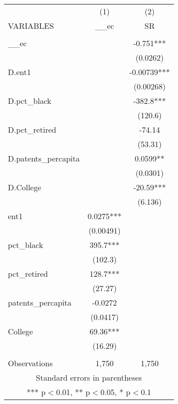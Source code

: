 \begin{tabular}{lcc} \hline
 & (1) & (2) \\
VARIABLES & \_\_ec & SR \\ \hline
 &  &  \\
\_\_ec &  & -0.751*** \\
 &  & (0.0262) \\
D.ent1 &  & -0.00739*** \\
 &  & (0.00268) \\
D.pct\_black &  & -382.8*** \\
 &  & (120.6) \\
D.pct\_retired &  & -74.14 \\
 &  & (53.31) \\
D.patents\_percapita &  & 0.0599** \\
 &  & (0.0301) \\
D.College &  & -20.59*** \\
 &  & (6.136) \\
ent1 & 0.0275*** &  \\
 & (0.00491) &  \\
pct\_black & 395.7*** &  \\
 & (102.3) &  \\
pct\_retired & 128.7*** &  \\
 & (27.27) &  \\
patents\_percapita & -0.0272 &  \\
 & (0.0417) &  \\
College & 69.36*** &  \\
 & (16.29) &  \\
 &  &  \\
 Observations & 1,750 & 1,750 \\ \hline
\multicolumn{3}{c}{ Standard errors in parentheses} \\
\multicolumn{3}{c}{ *** p$<$0.01, ** p$<$0.05, * p$<$0.1} \\
\end{tabular}
